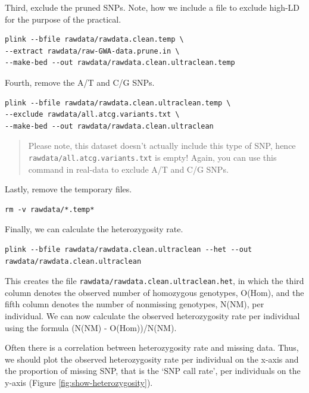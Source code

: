 \documentclass[
]{book}
\newcommand{\passthrough}[1]{#1}
\begin{document}
Third, exclude the pruned SNPs. Note, how we include a file to exclude high-LD for the purpose of the practical.

\begin{lstlisting}
plink --bfile rawdata/rawdata.clean.temp \
--extract rawdata/raw-GWA-data.prune.in \
--make-bed --out rawdata/rawdata.clean.ultraclean.temp
\end{lstlisting}

Fourth, remove the A/T and C/G SNPs.

\begin{lstlisting}
plink --bfile rawdata/rawdata.clean.ultraclean.temp \
--exclude rawdata/all.atcg.variants.txt \
--make-bed --out rawdata/rawdata.clean.ultraclean
\end{lstlisting}

\begin{quote}
Please note, this dataset doesn't actually include this type of SNP, hence \passthrough{\lstinline!rawdata/all.atcg.variants.txt!} is empty! Again, you can use this command in real-data to exclude A/T and C/G SNPs.
\end{quote}

Lastly, remove the temporary files.

\begin{lstlisting}
rm -v rawdata/*.temp*
\end{lstlisting}

Finally, we can calculate the heterozygosity rate.

\begin{lstlisting}
plink --bfile rawdata/rawdata.clean.ultraclean --het --out rawdata/rawdata.clean.ultraclean
\end{lstlisting}

This creates the file \passthrough{\lstinline!rawdata/rawdata.clean.ultraclean.het!}, in which the third column denotes the observed number of homozygous genotypes, O(Hom), and the fifth column denotes the number of nonmissing genotypes, N(NM), per individual. We can now calculate the observed heterozygosity rate per individual using the formula (N(NM) - O(Hom))/N(NM).

Often there is a correlation between heterozygosity rate and missing data. Thus, we should plot the observed heterozygosity rate per individual on the x-axis and the proportion of missing SNP, that is the `SNP call rate', per individuals on the y-axis (Figure \ref{fig:show-heterozygosity}).
\end{document}
